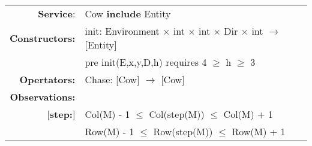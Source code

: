 
\begin{tabular}{rl}
\textbf{Service}: & \quad Cow \textbf{include} Entity\\

\textbf{Constructors:}  & 
init: Environment $\times$ int $\times$ int $\times$ Dir $\times$ int $\rightarrow$ [Entity] \\
& 
\quad pre init(E,x,y,D,h) requires 4 $\geq$ h $\geq$ 3\\
\textbf{Opertators:}  & 
Chase: [Cow] $\rightarrow$ [Cow]\\
\textbf{Observations:} \\

[\textbf{step:}] &
Col(M) - 1 $\leq$ Col(step(M)) $\leq$ Col(M) + 1 \\
&
Row(M) - 1 $\leq$ Row(step(M)) $\leq$ Row(M) + 1

\end{tabular}
